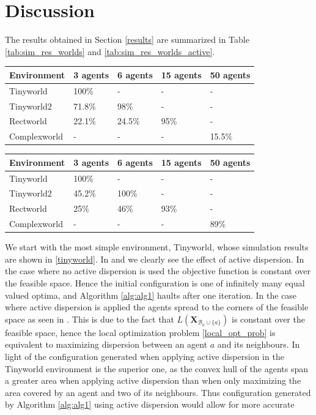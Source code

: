 \section{Discussion}
The results obtained in Section \ref{results} are summarized in Table \ref{tab:sim_res_worlds} and \ref{tab:sim_res_worlds_active}.
\begin{center}
  \begin{tabular}{l|l|l|l|l}
    Environment & 3 agents & 6 agents & 15 agents & 50 agents\\
    \hline
    Tinyworld & 100\% & - & - & - \\ 
    Tinyworld2 & 71.8\% & 98\% & - & - \\
    Rectworld &  22.1\% & 24.5\% & 95\% & - \\
    Complexworld & - & - & - & 15.5\% \\
  \end{tabular}
\end{center}
\begin{center}
  \begin{tabular}{l|l|l|l|l}
    Environment & 3 agents & 6 agents & 15 agents & 50 agents\\
    \hline
    Tinyworld & 100\% & - & - & - \\ 
    Tinyworld2 & 45.2\% & 100\% & - & - \\
    Rectworld &  25\% & 46\% & 93\% & - \\
    Complexworld & - & - & - & 89\% \\
  \end{tabular}
\end{center}

We start with the most simple environment, Tinyworld, whose simulation results are shown in \ref{tinyworld}. In  and  we clearly see the 
effect of active dispersion. In the case where no active dispersion is used the objective function is constant over the feasible space. Hence the initial configuration is one of 
infinitely many equal valued optima, and Algorithm \ref{alg:alg1} haults after one iteration. In the case where active dispersion is applied the agents spread to the corners of the
feasible space as seen in . This is due to the fact that $L(\mathbf{X}_{\mathcal{B}_{a}\cup\{a\}})$ is constant over the feasible space, hence the 
local optimization problem \eqref{local_opt_prob} is equivalent to maximizing dispersion between an agent $a$ and its neighbours. In light of \cite{CRB_multilat} the configuration generated
when applying active dispersion in the Tinyworld environment is the superior one, as the convex hull of the agents span a greater area when applying active dispersion than when only maximizing the area covered
by an agent and two of its neighbours. Thus configuration generated by Algorithm \ref{alg:alg1} using active dispersion would allow for more accurate 

